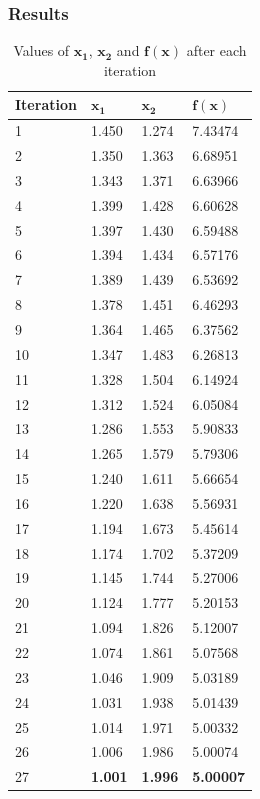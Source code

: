 \documentclass{article}
\begin{document}
\subsubsection*{Results}
\begin{table}[H]
\centering
\caption{Values of $\mathbf{x_1}$, $\mathbf{x_2}$ and $\mathbf{f(x)}$ after each iteration}
\label{my-label1}
\begin{tabular}{|l|l|l|l|}\hline
\textbf{Iteration} & $\mathbf{x_1}$ & $\mathbf{x_2}$ & $\mathbf{f(x)}$ \\ \hline
1 & 1.450  & 1.274 & 7.43474 \\ \hline
2 & 1.350  & 1.363 & 6.68951 \\ \hline
3 & 1.343  & 1.371 & 6.63966 \\ \hline
4 & 1.399  & 1.428 & 6.60628 \\ \hline
5 & 1.397  & 1.430 & 6.59488 \\ \hline
6 & 1.394  & 1.434 & 6.57176 \\ \hline
7 & 1.389  & 1.439 & 6.53692 \\ \hline
8 & 1.378  & 1.451 & 6.46293 \\ \hline
9 & 1.364  & 1.465 & 6.37562 \\ \hline
10 & 1.347 & 1.483 & 6.26813 \\ \hline
11 & 1.328 & 1.504 & 6.14924 \\ \hline
12 & 1.312 & 1.524 & 6.05084 \\ \hline
13 & 1.286 & 1.553 & 5.90833 \\ \hline
14 & 1.265 & 1.579 & 5.79306 \\ \hline
15 & 1.240 & 1.611 & 5.66654 \\ \hline
16 & 1.220 & 1.638 & 5.56931 \\ \hline
17 & 1.194 & 1.673 & 5.45614 \\ \hline
18 & 1.174 & 1.702 & 5.37209 \\ \hline
19 & 1.145 & 1.744 & 5.27006 \\ \hline
20 & 1.124 & 1.777 & 5.20153 \\ \hline
21 & 1.094 & 1.826 & 5.12007 \\ \hline
22 & 1.074 & 1.861 & 5.07568 \\ \hline
23 & 1.046 & 1.909 & 5.03189 \\ \hline
24 & 1.031 & 1.938 & 5.01439 \\ \hline
25 & 1.014 & 1.971 & 5.00332 \\ \hline
26 & 1.006 & 1.986 & 5.00074 \\ \hline
27 & \textbf{1.001} & \textbf{1.996} & \textbf{5.00007} \\ \hline
\end{tabular}
\end{table}
\end{document}
